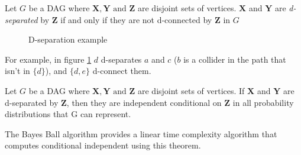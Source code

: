 \begin{definition}
Let \(G\) be a DAG where \(\bm{X}, \bm{Y} \text{ and } \bm{Z}\)
are disjoint sets of vertices. \(\bm{X}\) and \(\bm{Y}\)
are \emph{d-separated} by \(\bm{Z}\) if and only if they are not
d-connected by \(\bm{Z}\) in \(G\)
\end{definition}

\begin{figure}[h]
\centering
{}
\caption{D-separation example}
\label{fig:d-sep}
\end{figure}

For example, in figure \ref{fig:d-sep} \(d\) d-separates \(a\) and \(c\) (\(b\)
is a collider in the path that isn't in \(\{d\}\)),
and \(\{d,e\}\) d-connect them.

\begin{theorem}
Let \(G\) be a DAG where \(\bm{X}, \bm{Y} \text{ and } \bm{Z}\)
are disjoint sets of vertices. If  \(\bm{X}\) and \(\bm{Y}\)
are d-separated by \(\bm{Z}\), then they are independent conditional
on \(\bm{Z}\) in all probability distributions that G can represent.
\end{theorem}

The Bayes Ball algorithm \cite{bayes_ball} provides a linear time complexity
algorithm that computes conditional independent using this theorem.



